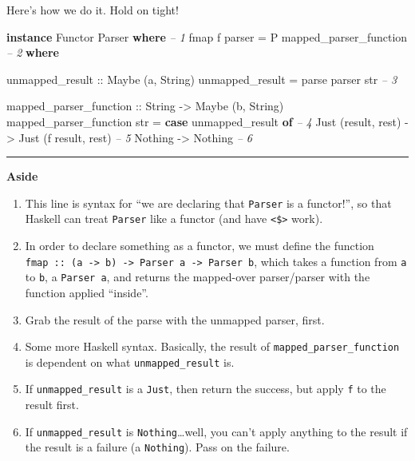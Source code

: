 \documentclass[]{article}
\newenvironment{Shaded}{}{}
\newcommand{\CommentTok}[1]{\textcolor[rgb]{0.38,0.63,0.69}{\textit{#1}}}
\newcommand{\DataTypeTok}[1]{\textcolor[rgb]{0.56,0.13,0.00}{#1}}
\newcommand{\FunctionTok}[1]{\textcolor[rgb]{0.02,0.16,0.49}{#1}}
\newcommand{\KeywordTok}[1]{\textcolor[rgb]{0.00,0.44,0.13}{\textbf{#1}}}
\newcommand{\NormalTok}[1]{#1}
\newcommand{\OtherTok}[1]{\textcolor[rgb]{0.00,0.44,0.13}{#1}}
\begin{document}
Here's how we do it. Hold on tight!

\begin{Shaded}
\begin{Highlighting}[]
\KeywordTok{instance} \DataTypeTok{Functor} \DataTypeTok{Parser} \KeywordTok{where}                                       \CommentTok{-- 1}
\NormalTok{    fmap f parser }\FunctionTok{=} \DataTypeTok{P}\NormalTok{ mapped_parser_function                        }\CommentTok{-- 2}
        \KeywordTok{where}

\OtherTok{            unmapped_result ::} \DataTypeTok{Maybe}\NormalTok{ (a, }\DataTypeTok{String}\NormalTok{)}
\NormalTok{            unmapped_result }\FunctionTok{=}\NormalTok{ parse parser str                      }\CommentTok{-- 3}

\OtherTok{            mapped_parser_function ::} \DataTypeTok{String} \OtherTok{->} \DataTypeTok{Maybe}\NormalTok{ (b, }\DataTypeTok{String}\NormalTok{)}
\NormalTok{            mapped_parser_function str }\FunctionTok{=}
                \KeywordTok{case}\NormalTok{ unmapped_result }\KeywordTok{of}                             \CommentTok{-- 4}
                    \DataTypeTok{Just}\NormalTok{ (result, rest) }\OtherTok{->} \DataTypeTok{Just}\NormalTok{ (f result, rest)    }\CommentTok{-- 5}
                    \DataTypeTok{Nothing}             \OtherTok{->} \DataTypeTok{Nothing}                  \CommentTok{-- 6}
\end{Highlighting}
\end{Shaded}

\begin{center}\rule{0.5\linewidth}{\linethickness}\end{center}

\textbf{Aside}

\begin{enumerate}
\def\labelenumi{\arabic{enumi}.}
\tightlist
\item
  This line is syntax for ``we are declaring that \texttt{Parser} is a
  functor!'', so that Haskell can treat \texttt{Parser} like a functor (and have
  \texttt{\textless{}\$\textgreater{}} work).
\item
  In order to declare something as a functor, we must define the function
  \texttt{fmap\ ::\ (a\ -\textgreater{}\ b)\ -\textgreater{}\ Parser\ a\ -\textgreater{}\ Parser\ b},
  which takes a function from \texttt{a} to \texttt{b}, a \texttt{Parser\ a},
  and returns the mapped-over parser/parser with the function applied
  ``inside''.
\item
  Grab the result of the parse with the unmapped parser, first.
\item
  Some more Haskell syntax. Basically, the result of
  \texttt{mapped\_parser\_function} is dependent on what
  \texttt{unmapped\_result} is.
\item
  If \texttt{unmapped\_result} is a \texttt{Just}, then return the success, but
  apply \texttt{f} to the result first.
\item
  If \texttt{unmapped\_result} is \texttt{Nothing}\ldots{}well, you can't apply
  anything to the result if the result is a failure (a \texttt{Nothing}). Pass
  on the failure.
\end{enumerate}
\end{document}
